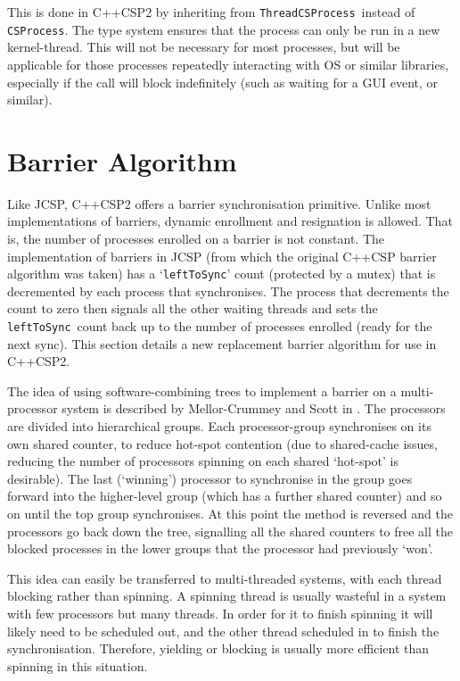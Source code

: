 \documentclass[12pt]{IOS-Book-Article-CPA-2007}
\newcommand{\code}[1]{{\small\texttt{#1}}}
\begin{document}
This is done in C++CSP2 by inheriting from \code{ThreadCSProcess}~instead of \code{CSProcess}.  The type system ensures that the process can only
be run in a new kernel-thread.  This will not be necessary for most processes, but will be applicable for those processes repeatedly interacting with OS or similar
libraries, especially if the call will block indefinitely (such as waiting for a GUI event, or similar).

\section{Barrier Algorithm}

\label{sec-barrier}

Like JCSP, C++CSP2 offers a barrier synchronisation primitive.  Unlike most implementations of barriers, dynamic enrollment and resignation is 
allowed.  That is, the number of processes enrolled on a barrier is not constant.  The implementation of barriers in JCSP (from which the original 
C++CSP barrier algorithm was taken) has a `\code{leftToSync}' count (protected by a mutex) that is decremented
by each process that synchronises.  The process that decrements the count to zero then signals all the other waiting threads and sets the 
\code{leftToSync}~count back up to the number of processes enrolled (ready for the next sync).  This section details a new replacement barrier algorithm for use 
in C++CSP2.

The idea of using software-combining trees to implement a barrier on a multi-processor system is described by Mellor-Crummey and Scott in 
\cite{mellor-crummey-scott-91}.  The processors are divided into hierarchical
groups.  Each processor-group synchronises on its own shared counter, to reduce hot-spot contention (due to shared-cache issues, reducing the number 
of processors spinning on each shared `hot-spot' is desirable).  The last (`winning') processor to synchronise in the group goes forward into
the higher-level group (which has a further shared counter) and so on until the top group synchronises.  At this point the method is reversed and the 
processors go back down the tree, signalling all the shared counters to free all the blocked processes in the lower groups that the processor had previously `won'.

This idea can easily be transferred to multi-threaded systems, with each thread blocking rather than spinning. A spinning thread is usually wasteful in a 
system with few processors but many threads.  In order for it to finish spinning it will likely need to be scheduled out, and the other thread scheduled in 
to finish the synchronisation.  Therefore, yielding or blocking is usually more efficient than spinning in this situation.
\end{document}
